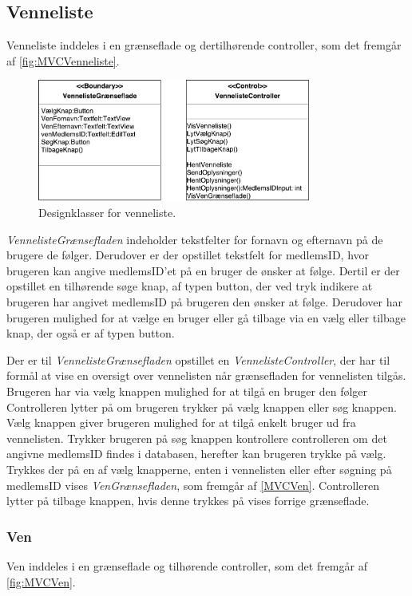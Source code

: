 \subsection*{Venneliste}
Venneliste inddeles i en grænseflade og dertilhørende controller, som det fremgår af \autoref{fig:MVCVenneliste}. 

\begin{figure} [H]
\centering
\includegraphics[width=0.8\textwidth]{figures/MVC/MVCVenneliste}
\caption{Designklasser for venneliste.}
\label{fig:MVCVenneliste}
\end{figure}

\noindent
\textit{VennelisteGrænsefladen} indeholder tekstfelter for fornavn og efternavn på de brugere de følger. Derudover er der opstillet tekstfelt for medlemsID, hvor brugeren kan angive medlemsID'et på en bruger de ønsker at følge. Dertil er der opstillet en tilhørende søge knap, af typen button, der ved tryk indikere at brugeren har angivet medlemsID på brugeren den ønsker at følge. Derudover har brugeren mulighed for at vælge en bruger eller gå tilbage via en vælg eller tilbage  knap, der også er af typen button. 


Der er til \textit{VennelisteGrænsefladen} opstillet en \textit{VennelisteController}, der har til formål at vise en oversigt over vennelisten når grænsefladen for vennelisten tilgås. Brugeren har via vælg knappen mulighed for at tilgå en bruger den følger
Controlleren lytter på om brugeren trykker på vælg knappen eller søg knappen. Vælg knappen giver brugeren mulighed for at tilgå enkelt bruger ud fra vennelisten. Trykker brugeren på søg knappen kontrollere controlleren om det angivne medlemsID findes i databasen, herefter kan brugeren trykke på vælg. Trykkes der på en af vælg knapperne, enten i vennelisten eller efter søgning på medlemsID vises \textit{VenGrænsefladen}, som fremgår af \autoref{MVCVen}. Controlleren lytter på tilbage knappen, hvis denne trykkes på vises forrige grænseflade. 


\subsubsection*{Ven}
Ven inddeles i en grænseflade og tilhørende controller, som det fremgår af \autoref{fig:MVCVen}.


